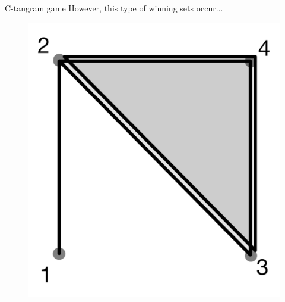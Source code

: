 \documentclass{beamer}
\begin{document}
\begin{frame}{C-tangram game}
However, this type of winning sets occur...
    \begin{figure}
        \centering
        \includegraphics[scale=0.15]{images/Another.png}
    \end{figure}
\end{frame}
\end{document}
